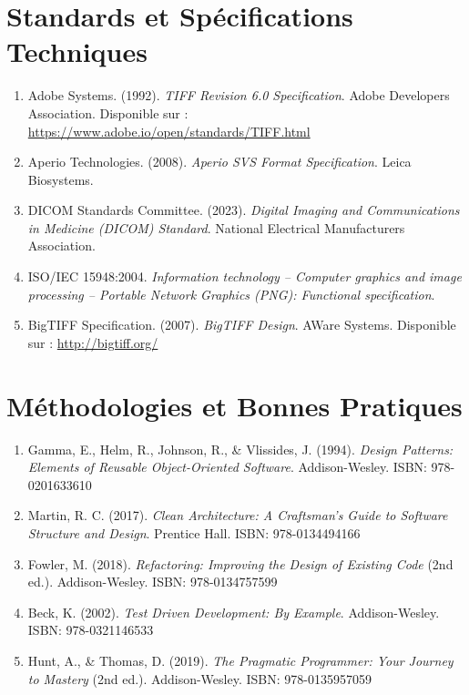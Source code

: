 \documentclass[12pt,a4paper]{report}
\begin{document}
\section{Standards et Spécifications Techniques}

\begin{enumerate}
\item Adobe Systems. (1992). \textit{TIFF Revision 6.0 Specification}. Adobe Developers Association. Disponible sur : \url{https://www.adobe.io/open/standards/TIFF.html}

\item Aperio Technologies. (2008). \textit{Aperio SVS Format Specification}. Leica Biosystems.

\item DICOM Standards Committee. (2023). \textit{Digital Imaging and Communications in Medicine (DICOM) Standard}. National Electrical Manufacturers Association.

\item ISO/IEC 15948:2004. \textit{Information technology -- Computer graphics and image processing -- Portable Network Graphics (PNG): Functional specification}.

\item BigTIFF Specification. (2007). \textit{BigTIFF Design}. AWare Systems. Disponible sur : \url{http://bigtiff.org/}
\end{enumerate}

\section{Méthodologies et Bonnes Pratiques}

\begin{enumerate}
\item Gamma, E., Helm, R., Johnson, R., \& Vlissides, J. (1994). \textit{Design Patterns: Elements of Reusable Object-Oriented Software}. Addison-Wesley. ISBN: 978-0201633610

\item Martin, R. C. (2017). \textit{Clean Architecture: A Craftsman's Guide to Software Structure and Design}. Prentice Hall. ISBN: 978-0134494166

\item Fowler, M. (2018). \textit{Refactoring: Improving the Design of Existing Code} (2nd ed.). Addison-Wesley. ISBN: 978-0134757599

\item Beck, K. (2002). \textit{Test Driven Development: By Example}. Addison-Wesley. ISBN: 978-0321146533

\item Hunt, A., \& Thomas, D. (2019). \textit{The Pragmatic Programmer: Your Journey to Mastery} (2nd ed.). Addison-Wesley. ISBN: 978-0135957059
\end{enumerate}
\end{document}
